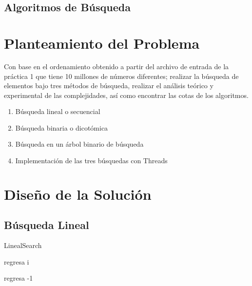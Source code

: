 \documentclass[12pt, fleqn]{article}                             %
\theoremstyle{break}                                            %
\begin{document}
    \subsection{Algoritmos de Búsqueda}




\clearpage
\section{Planteamiento del Problema}


    Con base en el ordenamiento obtenido a partir del archivo de entrada de la práctica
    1 que tiene 10 millones de números diferentes; realizar la búsqueda de elementos
    bajo tres métodos de búsqueda, realizar el análisis teórico y experimental
    de las complejidades, así como encontrar las cotas de los algoritmos.
    
    \begin{enumerate}\setlength\itemsep{0em}
        \item Búsqueda lineal o secuencial
        \item Búsqueda binaria o dicotómica
        \item Búsqueda en un árbol binario de búsqueda
        \item Implementación de las tres búsquedas con Threads
    \end{enumerate}


\clearpage
\section{Diseño de la Solución}

    \subsection{Búsqueda Lineal}
        \begin{algorithm}[H]
        \caption{LinealSearch}
        \begin{algorithmic}[1]
                    \State regresa i
                \EndIf
            \EndFor

            \State regresa -1
            \EndProcedure
            \end{algorithmic}
        \end{algorithm}
        
\end{document}
